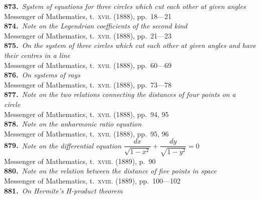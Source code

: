 \documentclass[11pt,a4paper]{article}
\providecommand{\textsc}[1]{{\scshape #1}}
\begin{document}
\small
\noindent\textbf{873.}~\textit{System of equations for three circles which cut each other at given angles}~\\
\hspace*{2em}Messenger of Mathematics, t.~\textsc{xvii}. (1888), pp.~18---21\\[0.3em]
\textbf{874.}~\textit{Note on the Legendrian coefficients of the second kind}~\\
\hspace*{2em}Messenger of Mathematics, t.~\textsc{xvii}. (1888), pp.~21---23\\[0.3em]
\textbf{875.}~\textit{On the system of three circles which cut each other at given angles and have their centres in a line}~\\
\hspace*{2em}Messenger of Mathematics, t.~\textsc{xvii}. (1888), pp.~60---69\\[0.3em]
\textbf{876.}~\textit{On systems of rays}~\\
\hspace*{2em}Messenger of Mathematics, t.~\textsc{xvii}. (1888), pp.~73---78\\[0.3em]
\textbf{877.}~\textit{Note on the two relations connecting the distances of four points on a circle}~\\
\hspace*{2em}Messenger of Mathematics, t.~\textsc{xvii}. (1888), pp.~94, 95\\[0.3em]
\textbf{878.}~\textit{Note on the anharmonic ratio equation}~\\
\hspace*{2em}Messenger of Mathematics, t.~\textsc{xvii}. (1888), pp.~95, 96\\[0.3em]
\textbf{879.}~\textit{Note on the differential equation $\dfrac{dx}{\sqrt{1-x^{2}}} + \dfrac{dy}{\sqrt{1-y^{2}}} = 0$}~\\
\hspace*{2em}Messenger of Mathematics, t.~\textsc{xviii}. (1889), p.~90\\[0.3em]
\textbf{880.}~\textit{Note on the relation between the distance of five points in space}~\\
\hspace*{2em}Messenger of Mathematics, t.~\textsc{xviii}. (1889), pp.~100---102\\[0.3em]
\textbf{881.}~\textit{On Hermite's H-product theorem}~\\
\end{document}
